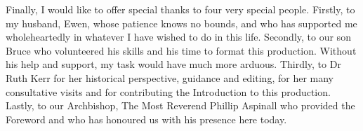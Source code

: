 \balance
Finally, I would like to offer special thanks to four very special people. Firstly, to my husband, Ewen, whose patience knows no bounds, and who has supported me wholeheartedly in whatever I have wished to do in this life. Secondly, to our son Bruce who volunteered his skills and his time to format this production. Without his help and support, my task would have much more arduous. Thirdly, to Dr Ruth Kerr for her historical perspective, guidance and editing, for her many consultative visits and for contributing the Introduction to this production. Lastly, to our Archbishop, The Most Reverend Phillip Aspinall who provided the Foreword and who has honoured us with his presence here today.

